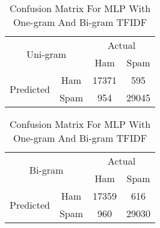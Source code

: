 \begin{table}[H]
\centering
\begin{subtable}{.5\textwidth}
\centering
\begin{tabular}{@{}|c|c|c|c|@{}}
\toprule
\multicolumn{2}{|c|}{\multirow{2}{*}{Uni-gram}} & \multicolumn{2}{c|}{Actual} \\ \cmidrule(l){3-4} 
\multicolumn{2}{|c|}{}                        & Ham          & Spam         \\ \midrule
\multirow{2}{*}{Predicted}       & Ham        & 17371        & 595 \\ \cmidrule(l){2-4} 
                                 & Spam       & 954         & 29045        \\ \bottomrule
\end{tabular}

\begin{tabular}{@{}|c|c|c|c|@{}}
\toprule
\multicolumn{2}{|c|}{\multirow{2}{*}{Bi-gram}} & \multicolumn{2}{c|}{Actual} \\ \cmidrule(l){3-4} 
\multicolumn{2}{|c|}{}                        & Ham          & Spam         \\ \midrule
\multirow{2}{*}{Predicted}       & Ham        & 17359   	  & 616 \\ \cmidrule(l){2-4} 
                                 & Spam       & 960 		  & 29030 \\ \bottomrule
\end{tabular}
\end{subtable}
\caption{Confusion Matrix For MLP With One-gram And Bi-gram TFIDF}
\label{Confusion_MLP}
\end{table}



